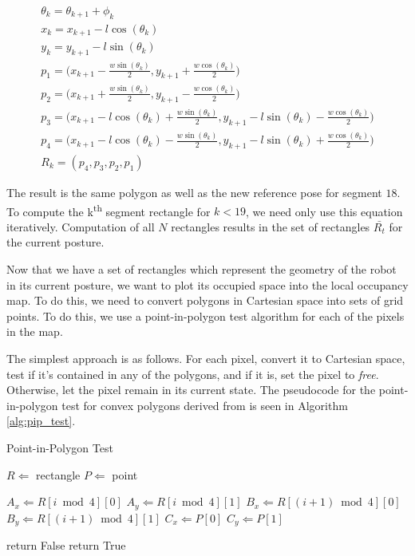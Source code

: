 \begin{equation}
\label{equ:rect2}
\begin{array}{l}
\displaystyle \theta_k = \theta_{k+1} + \phi_k \\
\displaystyle x_k = x_{k+1} - l \cos(\theta_k) \\ 
\displaystyle y_k = y_{k+1} - l \sin(\theta_k) \\
\displaystyle p_1 = \bigg( x_{k+1} - \frac{w\sin(\theta_k)}{2} , y_{k+1} + \frac{w\cos(\theta_k)}{2}\bigg) \\
\displaystyle p_2 = \bigg( x_{k+1} + \frac{w\sin(\theta_k)}{2}, y_{k+1} - \frac{w\cos(\theta_k)}{2} \bigg) \\
\displaystyle p_3 = \bigg( x_{k+1} - l\cos(\theta_k) + \frac{w\sin(\theta_k)}{2}, y_{k+1} - l\sin(\theta_k) - \frac{w\cos(\theta_k)}{2} \bigg) \\
\displaystyle p_4 = \bigg( x_{k+1} - l\cos(\theta_k) - \frac{w\sin(\theta_k)}{2}, y_{k+1} - l\sin(\theta_k) + \frac{w\cos(\theta_k)}{2} \bigg) \\ 
\displaystyle R_k = (p_4,p_3,p_2,p_1)
\end{array}
\end{equation}

The result is the same polygon as well as the new reference pose for segment $18$.  To compute the k\textsuperscript{th} segment rectangle for $k < 19$, we need only use this equation iteratively.  Computation of all $N$ rectangles results in the set of rectangles $\bar{R_t}$ for the current posture.

Now that we have a set of rectangles which represent the geometry of the robot in its current posture, we want to plot its occupied space into the local occupancy map.  To do this, we need to convert polygons in Cartesian space into sets of grid points.  To do this, we use a point-in-polygon test algorithm for each of the pixels in the map.

The simplest approach is as follows.  For each pixel, convert it to Cartesian space, test if it's contained in any of the polygons, and if it is, set the pixel to \emph{free}.  Otherwise, let the pixel remain in its current state.  The pseudocode for the point-in-polygon test for convex polygons derived from \cite{orourke98} is seen in Algorithm \ref{alg:pip_test}.

\begin{algorithm}
\caption{Point-in-Polygon Test}          %
\label{alg:pip_test}
\begin{algorithmic}

\State $R \Leftarrow $ rectangle
\State $P \Leftarrow $ point

\State $A_x \Leftarrow R[i \bmod 4][0] $
\State $A_y \Leftarrow R[i \bmod 4][1] $
\State $B_x \Leftarrow R[(i+1) \bmod 4][0] $
\State $B_y \Leftarrow R[(i+1) \bmod 4][1] $
\State $C_x \Leftarrow P[0] $
\State $C_y \Leftarrow P[1] $

\State return False
\EndIf
\EndFor
\State return True

\end{algorithmic}
\end{algorithm}

